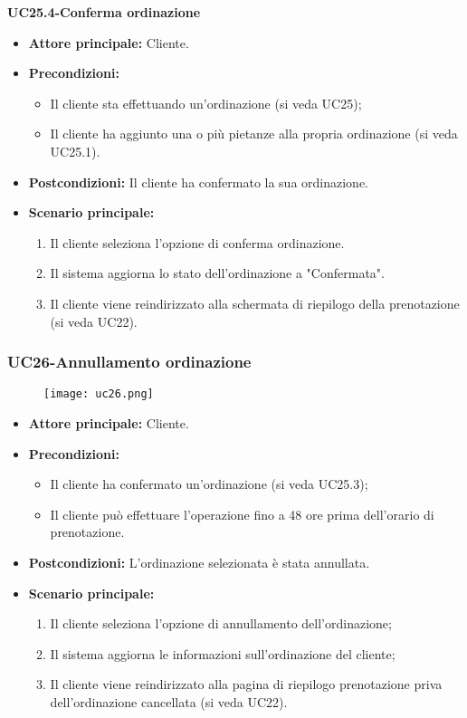 \textbf{UC25.4-Conferma ordinazione}
\begin{itemize}
\item \textbf{Attore principale:} Cliente.
\item \textbf{Precondizioni:}
    \begin{itemize}
        \item Il cliente sta effettuando un'ordinazione (si veda UC25);
        \item Il cliente ha aggiunto una o più pietanze alla propria ordinazione (si veda UC25.1).
    \end{itemize}
\item \textbf{Postcondizioni:} Il cliente ha confermato la sua ordinazione.
\item \textbf{Scenario principale:}
    \begin{enumerate}
        \item Il cliente seleziona l'opzione di conferma ordinazione.
        \item Il sistema aggiorna lo stato dell'ordinazione a "Confermata".
        \item Il cliente viene reindirizzato alla schermata di riepilogo della prenotazione (si veda UC22).
    \end{enumerate}
\end{itemize}

\pagebreak
\subsubsection{UC26-Annullamento ordinazione}
\begin{figure}[h] \texttt{[image: uc26.png]} \end{figure}
\begin{itemize}
\item \textbf{Attore principale:} Cliente.
\item \textbf{Precondizioni:}
\begin{itemize}
    \item Il cliente ha confermato un'ordinazione (si veda UC25.3);
    \item Il cliente può effettuare l'operazione fino a 48 ore prima dell'orario di prenotazione.
\end{itemize}
\item \textbf{Postcondizioni:} L'ordinazione selezionata è stata annullata.
\item \textbf{Scenario principale:}
\begin{enumerate}
    \item Il cliente seleziona l'opzione di annullamento dell'ordinazione;
    \item Il sistema aggiorna le informazioni sull'ordinazione del cliente;
    \item Il cliente viene reindirizzato alla pagina di riepilogo prenotazione priva dell'ordinazione cancellata (si veda UC22).
\end{enumerate}
\end{itemize}

